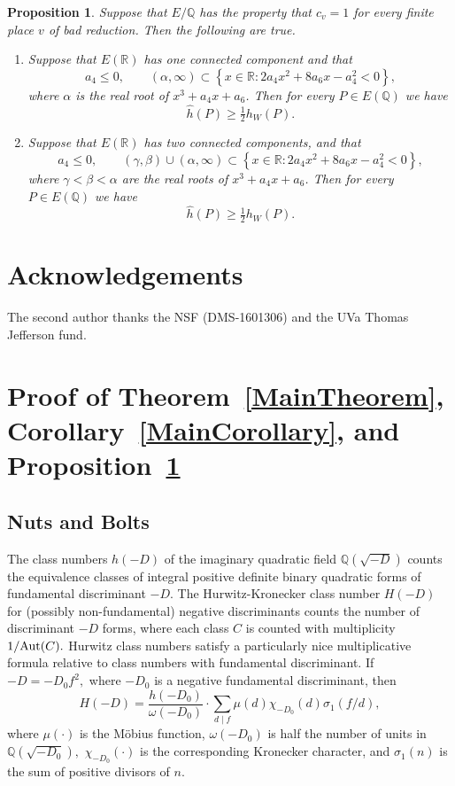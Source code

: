 \documentclass[12pt]{amsart}
\newtheorem{proposition}[theorem]{Proposition}
\newcommand{\Q}{\mathbb{Q}}
\newcommand{\R}{\mathbb{R}}
\numberwithin{equation}{section}
\begin{document}
 \begin{proposition}\label{deltaE} Suppose that $E/\Q$ has the property that $c_v=1$ for every finite place $v$  of bad reduction.  Then the following are true.
 \begin{enumerate}
 \item Suppose that $E(\R)$ has one connected component and that
  $$ a_4\leq 0,\qquad (\alpha,\infty)\subset\left\{x\in \R:2a_4x^2+8a_6x-a_4^2<0\right\},$$ where $\alpha$ is the real root of $x^3+a_4x+a_6$. Then for every $P\in E(\Q)$ we have
 $$\widehat{h}(P)\geq \tfrac{1}{2}h_W(P).$$

 \item Suppose that
 $E(\R)$ has two connected components, and that
  $$a_4\leq 0,\qquad (\gamma,\beta)\cup(\alpha,\infty)\subset\left\{x\in \R:2a_4x^2+8a_6x-a_4^2<0\right\},$$ where $\gamma<\beta<\alpha$ are the  real roots of $x^3+a_4x+a_6$.
 Then for every $P\in E(\Q)$ we have
 $$\widehat{h}(P)\geq \tfrac{1}{2}h_W(P).
 $$
 \end{enumerate}
\end{proposition}



\section*{Acknowledgements} \noindent  The second author thanks the NSF (DMS-1601306) and
the  UVa Thomas Jefferson fund. 

\section{Proof of Theorem~\ref{MainTheorem},  Corollary~\ref{MainCorollary}, and Proposition~\ref{deltaE}}

\subsection{Nuts and Bolts}

The class numbers $h(-D)$ of the imaginary quadratic field $\Q(\sqrt{-D})$ counts the equivalence classes of integral positive definite binary quadratic forms of fundamental discriminant $-D$.
The Hurwitz-Kronecker class number $H(-D)$ for (possibly non-fundamental) negative discriminants counts the number of discriminant $-D$ forms, where each class $C$ is counted with multiplicity $1/{\text {\rm Aut}}(C).$ Hurwitz class numbers satisfy a particularly nice multiplicative formula relative to class numbers with fundamental discriminant.  If $-D=-D_0 f^2,$ where $-D_0$ is a negative fundamental discriminant, then
\begin{equation}\label{Hecke}
H(-D)=\frac{h(-D_0)}{\omega(-D_0)}\cdot \sum_{d\mid f}\mu(d)\chi_{-D_0}(d)\sigma_1(f/d),
\end{equation}
where $\mu(\cdot)$ is the M\"obius function, $\omega(-D_0)$ is half the number of units in $\Q(\sqrt{-D_0}),$ $\chi_{-D_0}(\cdot)$ is the corresponding Kronecker character, and $\sigma_1(n)$ is the sum of positive divisors of $n$.
\end{document}
